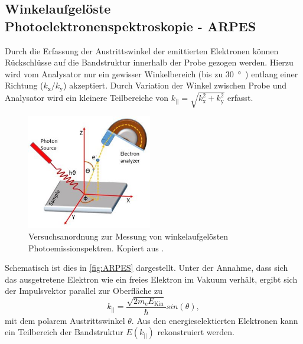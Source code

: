         \subsection{Winkelaufgelöste Photoelektronenspektroskopie - ARPES} \label{sec:ARPES}
            Durch die Erfassung der Austrittswinkel der emittierten Elektronen können Rückschlüsse auf die Bandstruktur innerhalb der Probe gezogen werden.
            Hierzu wird vom Analysator nur ein gewisser Winkelbereich (bis zu \SI{30}{\degree}~\cite{suga_photoelectron_2021}) entlang einer Richtung ($k_\text{x}/k_\text{y}$) akzeptiert.
            Durch Variation der Winkel zwischen Probe und Analysator wird ein kleinere Teilbereiche von $k_\text{||} = \sqrt{k_\text{x}^2 + k_\text{y}^2}$ erfasst.
            \begin{figure}
                \centering
                \includegraphics[height=5cm]{ARPES.jpg}
                \caption{Versuchsanordnung zur Messung von winkelaufgelösten Photoemissionspektren. Kopiert aus \cite{ARPES}.}
                \label{fig:ARPES}
            \end{figure}
            Schematisch ist dies in \autoref{fig:ARPES} dargestellt.
            Unter der Annahme, dass sich das ausgetretene Elektron wie ein freies Elektron im Vakuum verhält, ergibt sich der Impulsvektor parallel zur Oberfläche zu 
            \begin{equation}
                k_{||} = \frac{\sqrt{2 m_\text{e} E_\text{Kin}}}{\hbar} sin(\theta),
            \end{equation}
            mit dem polarem Austrittswinkel $\theta$.
            Aus den energieselektierten Elektronen kann ein Teilbereich der Bandstruktur $E(k_\text{||})$ rekonstruiert werden.
            

